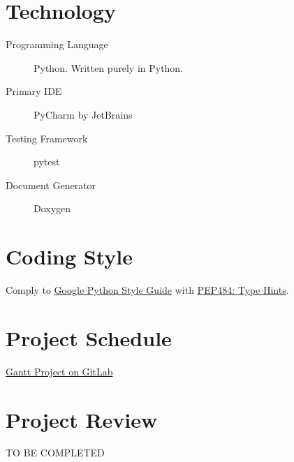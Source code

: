 \documentclass{article}
\begin{document}
\section{Technology}

\begin{description}
\item[Programming Language] Python. Written purely in Python.
\item[Primary IDE] PyCharm by JetBrains
\item[Testing Framework] pytest
\item[Document Generator] Doxygen
\end{description}

\section{Coding Style}

Comply to \href{https://google.github.io/styleguide/pyguide.html}{Google Python
  Style Guide} with \href{https://www.python.org/dev/peps/pep-0484/}{PEP484:
  Type Hints}.

\section{Project Schedule}

\href{https://gitlab.cas.mcmaster.ca/yex33/transitions_l02_grp16/-/blob/main/ProjectSchedule/Project%20Schedule.gan}{Gantt
  Project on GitLab}

\section{Project Review}

TO BE COMPLETED
\end{document}
